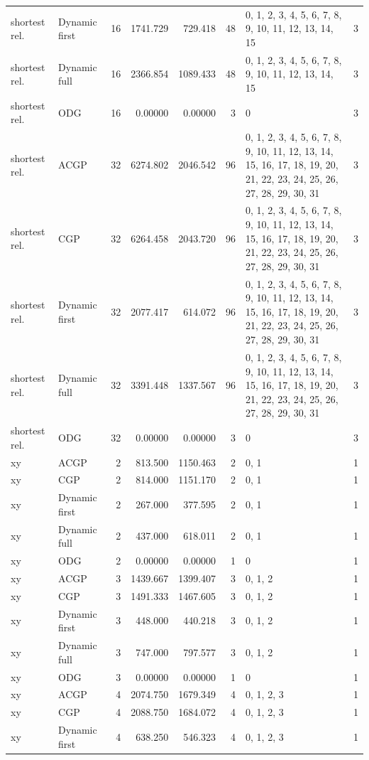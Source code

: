 \documentclass[10pt,a4paper]{article}
\begin{document}
\begin{longtable}{@{}p{23mm}p{29mm}rrrrp{36mm}r@{}}
shortest rel. & Dynamic first & 16 & 1741.729 & 729.418 & 48 & 0, 1, 2, 3, 4, 5, 6, 7, 8, 9, 10, 11, 12, 13, 14, 15 & 3 \\
shortest rel. & Dynamic full & 16 & 2366.854 & 1089.433 & 48 & 0, 1, 2, 3, 4, 5, 6, 7, 8, 9, 10, 11, 12, 13, 14, 15 & 3 \\
shortest rel. & ODG & 16 & 0.00000 & 0.00000 & 3 & 0 & 3 \\
shortest rel. & ACGP & 32 & 6274.802 & 2046.542 & 96 & 0, 1, 2, 3, 4, 5, 6, 7, 8, 9, 10, 11, 12, 13, 14, 15, 16, 17, 18, 19, 20, 21, 22, 23, 24, 25, 26, 27, 28, 29, 30, 31 & 3 \\
shortest rel. & CGP & 32 & 6264.458 & 2043.720 & 96 & 0, 1, 2, 3, 4, 5, 6, 7, 8, 9, 10, 11, 12, 13, 14, 15, 16, 17, 18, 19, 20, 21, 22, 23, 24, 25, 26, 27, 28, 29, 30, 31 & 3 \\
shortest rel. & Dynamic first & 32 & 2077.417 & 614.072 & 96 & 0, 1, 2, 3, 4, 5, 6, 7, 8, 9, 10, 11, 12, 13, 14, 15, 16, 17, 18, 19, 20, 21, 22, 23, 24, 25, 26, 27, 28, 29, 30, 31 & 3 \\
shortest rel. & Dynamic full & 32 & 3391.448 & 1337.567 & 96 & 0, 1, 2, 3, 4, 5, 6, 7, 8, 9, 10, 11, 12, 13, 14, 15, 16, 17, 18, 19, 20, 21, 22, 23, 24, 25, 26, 27, 28, 29, 30, 31 & 3 \\
shortest rel. & ODG & 32 & 0.00000 & 0.00000 & 3 & 0 & 3 \\
xy & ACGP & 2 & 813.500 & 1150.463 & 2 & 0, 1 & 1 \\
xy & CGP & 2 & 814.000 & 1151.170 & 2 & 0, 1 & 1 \\
xy & Dynamic first & 2 & 267.000 & 377.595 & 2 & 0, 1 & 1 \\
xy & Dynamic full & 2 & 437.000 & 618.011 & 2 & 0, 1 & 1 \\
xy & ODG & 2 & 0.00000 & 0.00000 & 1 & 0 & 1 \\
xy & ACGP & 3 & 1439.667 & 1399.407 & 3 & 0, 1, 2 & 1 \\
xy & CGP & 3 & 1491.333 & 1467.605 & 3 & 0, 1, 2 & 1 \\
xy & Dynamic first & 3 & 448.000 & 440.218 & 3 & 0, 1, 2 & 1 \\
xy & Dynamic full & 3 & 747.000 & 797.577 & 3 & 0, 1, 2 & 1 \\
xy & ODG & 3 & 0.00000 & 0.00000 & 1 & 0 & 1 \\
xy & ACGP & 4 & 2074.750 & 1679.349 & 4 & 0, 1, 2, 3 & 1 \\
xy & CGP & 4 & 2088.750 & 1684.072 & 4 & 0, 1, 2, 3 & 1 \\
xy & Dynamic first & 4 & 638.250 & 546.323 & 4 & 0, 1, 2, 3 & 1 \\

\end{longtable}
\end{document}
